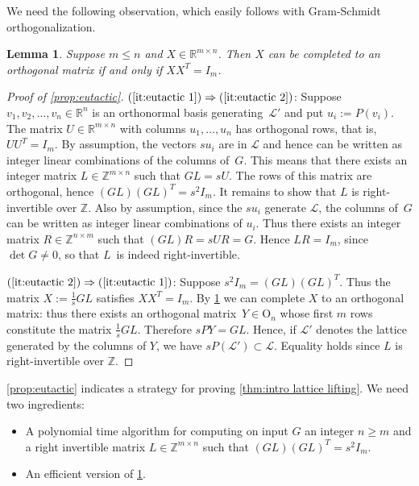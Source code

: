 \documentclass[10pt,a4paper]{article}
\newtheorem{lemma}[theorem]{Lemma}
\theoremstyle{definition}
\newcommand{\QQ}{\mathbb{Q}}
\newcommand{\ZZ}{\mathbb{Z}}
\newcommand{\RR}{\mathbb{R}}
\numberwithin{equation}{section}
\begin{document}
We need the following observation, which easily follows with
Gram-Schmidt orthogonalization.

\begin{lemma}\label{lem:ort-extension}
Suppose $m\leq n$ and $X\in\RR^{m\times n}$.
Then $X$ can be completed to an orthogonal matrix if and only if $XX^T=I_m$.
\end{lemma}

\begin{proof}[Proof of \cref{prop:eutactic}]
$(\ref{it:eutactic 1})\Rightarrow(\ref{it:eutactic 2})$:
Suppose $v_1,v_2,\dots,v_n\in\RR^n$ is an orthonormal basis
generating~$\mathcal{L}'$ and put $u_i := P(v_i)$.
The matrix $U\in\RR^{m\times n}$ with columns  $u_1,\ldots, u_n$ has orthogonal rows, that is, $UU^T = I_m$.
By assumption, the vectors $s u_i$ are in $\mathcal{L}$ and hence
can be written as integer linear combinations of the columns of~$G$.
This means that there exists an integer matrix $L\in\ZZ^{m\times n}$ such that
$G L =s U$.
The rows of this matrix are orthogonal, hence $(GL)(GL)^T = s^2 I_m$.
It remains to show that $L$ is right-invertible over $\ZZ$.
Also by assumption, since the $s u_i$ generate $\mathcal{L}$,
the columns of~$G$ can be written as integer linear combinations of $u_i$.
Thus there exists an integer matrix $R\in\ZZ^{n\times m}$ such that $(GL)R=sUR=G$.
Hence $LR=I_m$, since $\det G\neq 0$, so that $L$~is indeed right-invertible.

$(\ref{it:eutactic 2})\Rightarrow(\ref{it:eutactic 1})$:
Suppose $s^2 I_m=(GL)(GL)^T$. Thus the matrix
$X := \frac{1}{s}GL$ satisfies $XX^T=I_m$.
By \cref{lem:ort-extension} we can complete $X$ to an orthogonal matrix:
thus there exists an orthogonal matrix~$Y\in\mathrm{O}_n$
whose first $m$ rows constitute the matrix $\frac{1}{s}GL$.
Therefore $s PY=GL$. Hence, if $\mathcal{L}'$ denotes the lattice generated by the columns of $Y$,
we have $s P(\mathcal{L}')\subset\mathcal{L}$.
Equality holds since $L$ is right-invertible over $\ZZ$.
\end{proof}

\cref{prop:eutactic} indicates a strategy for proving \cref{thm:intro lattice lifting}.
We need two ingredients:

\begin{itemize}
\item A polynomial time algorithm for computing on input $G$
 an integer $n\geq m$ and a right invertible matrix
 $L\in\ZZ^{m\times n}$ such that $(GL)(GL)^T=s^2 I_m$.

\item An efficient version of \cref{lem:ort-extension}.
\end{itemize}
\end{document}
